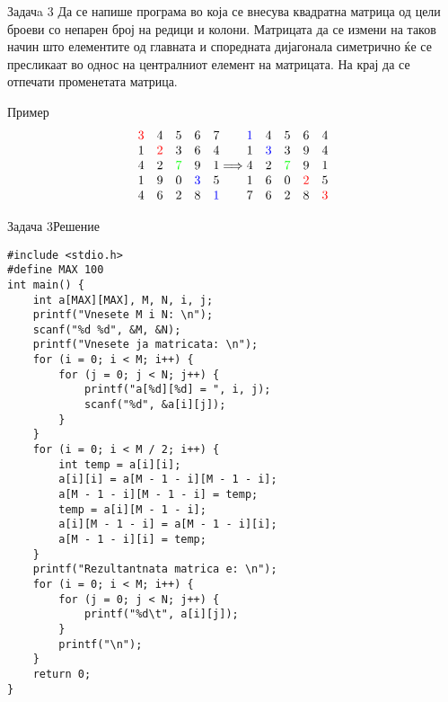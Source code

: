 \begin{frame}{Задачa 3}
Да се напише програма во која се внесува квадратна матрица од цели броеви со
непарен број на редици и колони. Матрицата да се измени на таков начин што
елементите од главната и споредната дијагонала симетрично ќе се пресликаат во
однос на централниот елемент на матрицата. На крај да се отпечати променетата
матрица.
\begin{exampleblock}{Пример}
\[
 \begin{matrix}
 \color{red}{3} & 4 & 5 & 6 & 7\\ 
 1 & \color{red}{2} & 3 & 6 & 4\\
 4 & 2 & \color{green}{7} & 9 & 1\\
 1 & 9 & 0 & \color{blue}{3} & 5\\ 
 4 & 6 & 2 & 8 & \color{blue}{1}
 \end{matrix}
 \Longrightarrow
 \begin{matrix}
    \color{blue}{1} & 4 & 5 & 6 & 4\\ 
    1 & \color{blue}{3} & 3 & 9 & 4\\
    4 & 2 & \color{green}{7} & 9 & 1\\
    1 & 6 & 0 & \color{red}{2} & 5\\ 
    7 & 6 & 2 & 8 & \color{red}{3}
 \end{matrix}
\]
\end{exampleblock}
\end{frame}

\begin{frame}[fragile,shrink=5]{Задача 3}{Решение}
\begin{lstlisting}
#include <stdio.h>
#define MAX 100
int main() {
    int a[MAX][MAX], M, N, i, j;
    printf("Vnesete M i N: \n");
    scanf("%d %d", &M, &N);
    printf("Vnesete ja matricata: \n");
    for (i = 0; i < M; i++) {
        for (j = 0; j < N; j++) {
            printf("a[%d][%d] = ", i, j);
            scanf("%d", &a[i][j]);
        }
    }
    for (i = 0; i < M / 2; i++) {
        int temp = a[i][i];
        a[i][i] = a[M - 1 - i][M - 1 - i];
        a[M - 1 - i][M - 1 - i] = temp;
        temp = a[i][M - 1 - i];
        a[i][M - 1 - i] = a[M - 1 - i][i];
        a[M - 1 - i][i] = temp;
    }
    printf("Rezultantnata matrica e: \n");
    for (i = 0; i < M; i++) {
        for (j = 0; j < N; j++) {
            printf("%d\t", a[i][j]);
        }
        printf("\n");
    }
    return 0;
}
\end{lstlisting}
\end{frame}

